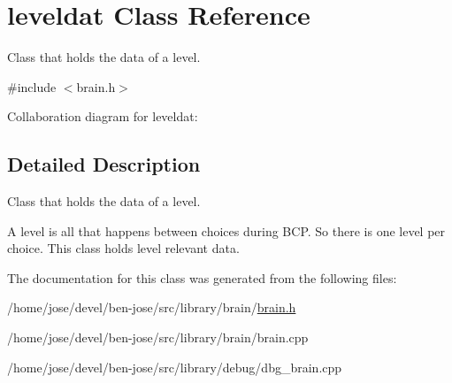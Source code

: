 \hypertarget{classleveldat}{}\section{leveldat Class Reference}
\label{classleveldat}


Class that holds the data of a level.  




{\ttfamily \#include $<$brain.\+h$>$}



Collaboration diagram for leveldat\+:


\subsection{Detailed Description}
Class that holds the data of a level. 

A level is all that happens between choices during B\+CP. So there is one level per choice. This class holds level relevant data. 

The documentation for this class was generated from the following files\+:\begin{DoxyCompactItemize}
\item 
/home/jose/devel/ben-\/jose/src/library/brain/\hyperlink{brain_8h}{brain.\+h}\item 
/home/jose/devel/ben-\/jose/src/library/brain/brain.\+cpp\item 
/home/jose/devel/ben-\/jose/src/library/debug/dbg\+\_\+brain.\+cpp\end{DoxyCompactItemize}
